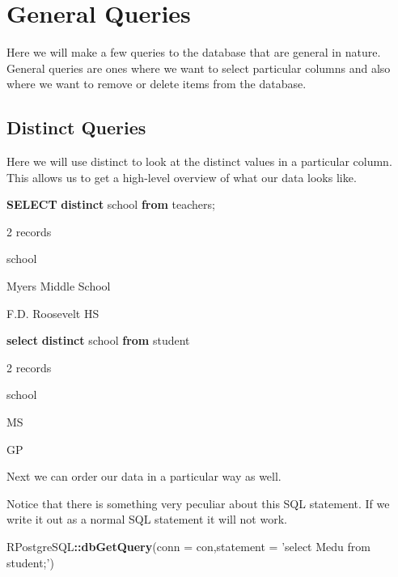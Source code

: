 \documentclass[]{book}
\newenvironment{Shaded}{\begin{snugshade}}{\end{snugshade}}
\newcommand{\KeywordTok}[1]{\textcolor[rgb]{0.13,0.29,0.53}{\textbf{#1}}}
\newcommand{\DataTypeTok}[1]{\textcolor[rgb]{0.13,0.29,0.53}{#1}}
\newcommand{\StringTok}[1]{\textcolor[rgb]{0.31,0.60,0.02}{#1}}
\newcommand{\OperatorTok}[1]{\textcolor[rgb]{0.81,0.36,0.00}{\textbf{#1}}}
\newcommand{\NormalTok}[1]{#1}
\begin{document}
\chapter{General Queries}\label{general-queries}

Here we will make a few queries to the database that are general in
nature. General queries are ones where we want to select particular
columns and also where we want to remove or delete items from the
database.

\section{Distinct Queries}\label{distinct-queries}

Here we will use distinct to look at the distinct values in a particular
column. This allows us to get a high-level overview of what our data
looks like.

\begin{Shaded}
\begin{Highlighting}[]
\KeywordTok{SELECT} \KeywordTok{distinct}\NormalTok{ school }\KeywordTok{from}\NormalTok{ teachers;}
\end{Highlighting}
\end{Shaded}

\label{tab:unnamed-chunk-18}2 records

school

Myers Middle School

F.D. Roosevelt HS

\begin{Shaded}
\begin{Highlighting}[]
\KeywordTok{select} \KeywordTok{distinct}\NormalTok{ school }\KeywordTok{from}\NormalTok{ student}
\end{Highlighting}
\end{Shaded}

\label{tab:unnamed-chunk-19}2 records

school

MS

GP

Next we can order our data in a particular way as well.

Notice that there is something very peculiar about this SQL statement.
If we write it out as a normal SQL statement it will not work.

\begin{Shaded}
\begin{Highlighting}[]
\NormalTok{RPostgreSQL}\OperatorTok{::}\KeywordTok{dbGetQuery}\NormalTok{(}\DataTypeTok{conn =}\NormalTok{ con,}\DataTypeTok{statement =} \StringTok{'select Medu from student;'}\NormalTok{)}
\end{Highlighting}
\end{Shaded}
\end{document}
